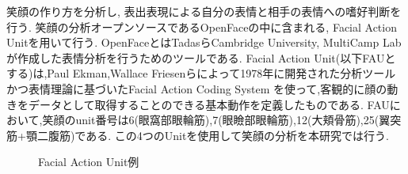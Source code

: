 

笑顔の作り方を分析し, 表出表現による自分の表情と相手の表情への嗜好判断を行う.
笑顔の分析オープンソースであるOpenFaceの中に含まれる, Facial Action Unitを用いて行う.
OpenFaceとはTadasらCambridge University, MultiCamp Labが作成した表情分析を行うためのツールである.
Facial Action Unit(以下FAUとする)は,Paul Ekman,Wallace Friesenらによって1978年に開発された分析ツールかつ表情理論に基づいたFacial Action Coding System
を使って,客観的に顔の動きをデータとして取得することのできる基本動作を定義したものである.
FAUにおいて,笑顔のunit番号は6(眼窩部眼輪筋),7(眼瞼部眼輪筋),12(大頬骨筋),25(翼突筋+顎二腹筋)である.
この4つのUnitを使用して笑顔の分析を本研究では行う.

\begin{figure}[htbp]
    \begin{center}
    \end{center}
    \caption{Facial Action Unit例}
    \label{fig:faus}
\end{figure}

